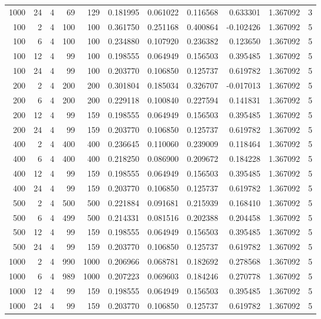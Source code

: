 \begin{table}
\begin{tabular}{rrrrrrrrrrr}
1000 & 24 & 4 & 69 & 129 & 0.181995 & 0.061022 & 0.116568 & 0.633301 & 1.367092 & 3 \\
100 & 2 & 4 & 100 & 100 & 0.361750 & 0.251168 & 0.400864 & -0.102426 & 1.367092 & 5 \\
100 & 6 & 4 & 100 & 100 & 0.234880 & 0.107920 & 0.236382 & 0.123650 & 1.367092 & 5 \\
100 & 12 & 4 & 99 & 100 & 0.198555 & 0.064949 & 0.156503 & 0.395485 & 1.367092 & 5 \\
100 & 24 & 4 & 99 & 100 & 0.203770 & 0.106850 & 0.125737 & 0.619782 & 1.367092 & 5 \\
200 & 2 & 4 & 200 & 200 & 0.301804 & 0.185034 & 0.326707 & -0.017013 & 1.367092 & 5 \\
200 & 6 & 4 & 200 & 200 & 0.229118 & 0.100840 & 0.227594 & 0.141831 & 1.367092 & 5 \\
200 & 12 & 4 & 99 & 159 & 0.198555 & 0.064949 & 0.156503 & 0.395485 & 1.367092 & 5 \\
200 & 24 & 4 & 99 & 159 & 0.203770 & 0.106850 & 0.125737 & 0.619782 & 1.367092 & 5 \\
400 & 2 & 4 & 400 & 400 & 0.236645 & 0.110060 & 0.239009 & 0.118464 & 1.367092 & 5 \\
400 & 6 & 4 & 400 & 400 & 0.218250 & 0.086900 & 0.209672 & 0.184228 & 1.367092 & 5 \\
400 & 12 & 4 & 99 & 159 & 0.198555 & 0.064949 & 0.156503 & 0.395485 & 1.367092 & 5 \\
400 & 24 & 4 & 99 & 159 & 0.203770 & 0.106850 & 0.125737 & 0.619782 & 1.367092 & 5 \\
500 & 2 & 4 & 500 & 500 & 0.221884 & 0.091681 & 0.215939 & 0.168410 & 1.367092 & 5 \\
500 & 6 & 4 & 499 & 500 & 0.214331 & 0.081516 & 0.202388 & 0.204458 & 1.367092 & 5 \\
500 & 12 & 4 & 99 & 159 & 0.198555 & 0.064949 & 0.156503 & 0.395485 & 1.367092 & 5 \\
500 & 24 & 4 & 99 & 159 & 0.203770 & 0.106850 & 0.125737 & 0.619782 & 1.367092 & 5 \\
1000 & 2 & 4 & 990 & 1000 & 0.206966 & 0.068781 & 0.182692 & 0.278568 & 1.367092 & 5 \\
1000 & 6 & 4 & 989 & 1000 & 0.207223 & 0.069603 & 0.184246 & 0.270778 & 1.367092 & 5 \\
1000 & 12 & 4 & 99 & 159 & 0.198555 & 0.064949 & 0.156503 & 0.395485 & 1.367092 & 5 \\
1000 & 24 & 4 & 99 & 159 & 0.203770 & 0.106850 & 0.125737 & 0.619782 & 1.367092 & 5 \\

\end{tabular}
\end{table}
